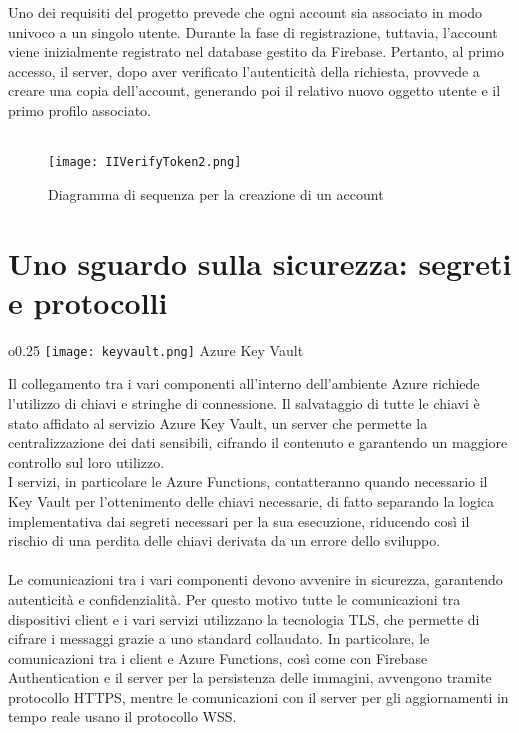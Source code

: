 Uno dei requisiti del progetto prevede
che ogni account sia associato in modo univoco a un singolo utente.
Durante la fase di registrazione, tuttavia,
l'account viene inizialmente registrato nel database gestito da Firebase.
Pertanto, al primo accesso, il server, dopo aver verificato l'autenticità della richiesta,
provvede a creare una copia dell'account,
generando poi il relativo nuovo oggetto utente e il primo profilo associato.\\
\\
\begin{figure}[htpb]
    \centering
    \texttt{[image: IIVerifyToken2.png]}
    \caption{Diagramma di sequenza per la creazione di un account}
\end{figure}

\clearpage
\section{Uno sguardo sulla sicurezza: segreti e protocolli}
\begin{wrapfigure}{o}{0.25\textwidth}
    \centering
    \texttt{[image: keyvault.png]}
    Azure Key Vault
\end{wrapfigure}
Il collegamento tra i vari componenti all'interno dell'ambiente Azure
richiede l'utilizzo di chiavi e stringhe di connessione.
Il salvataggio di tutte le chiavi è stato affidato al servizio Azure Key Vault,
un server che permette la centralizzazione dei dati sensibili,
cifrando il contenuto e garantendo un maggiore controllo sul loro utilizzo.\\
I servizi, in particolare le Azure Functions,
contatteranno quando necessario il Key Vault per l'ottenimento delle chiavi necessarie,
di fatto separando la logica implementativa dai segreti necessari per la sua esecuzione,
riducendo così il rischio di una perdita delle chiavi derivata da un errore dello sviluppo.\\
\\
Le comunicazioni tra i vari componenti devono avvenire in sicurezza,
garantendo autenticità e confidenzialità.
Per questo motivo tutte le comunicazioni tra dispositivi client e
i vari servizi utilizzano la tecnologia TLS,
che permette di cifrare i messaggi grazie a uno standard collaudato.
In particolare, le comunicazioni tra i client e Azure Functions,
così come con Firebase Authentication e il server per la persistenza delle immagini,
avvengono tramite protocollo HTTPS,
mentre le comunicazioni con il server per gli aggiornamenti in tempo reale usano il protocollo WSS.\\
